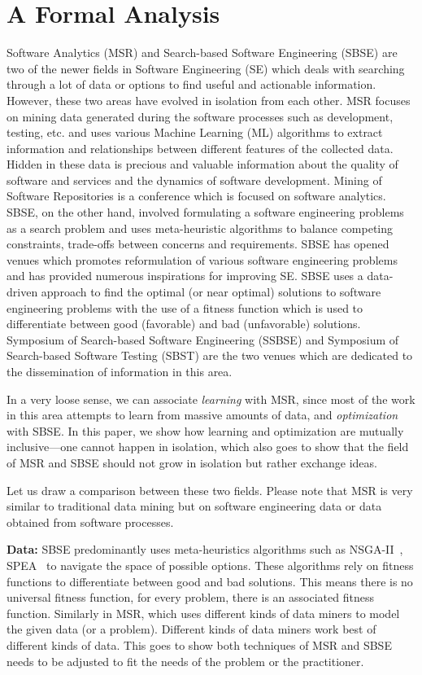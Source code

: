 \documentclass[table, xcdraw, sigconf,review, anonymous]{acmart}
\begin{document}
\section{A Formal Analysis}


Software Analytics (MSR) and Search-based Software Engineering (SBSE) are two of the newer fields in Software Engineering (SE) which deals with searching through a lot of data or options to find useful and actionable information. However, these two areas have evolved in isolation from each other. 
MSR focuses on mining data generated during the software processes such as development, testing, etc. and uses various Machine Learning (ML) algorithms to extract information and relationships between different features of the collected data. 
Hidden in these data is precious and valuable information about the quality of software and services and the dynamics of software development. Mining of Software Repositories is a conference which is focused on software analytics. SBSE, on the other hand, involved formulating a software engineering problems as a search problem and uses meta-heuristic algorithms to balance competing constraints, trade-offs between concerns and requirements. SBSE has opened venues which promotes reformulation of various software engineering problems and has provided numerous inspirations for improving SE.  SBSE uses a data-driven approach to find the optimal (or near optimal) solutions to software engineering problems with the use of a fitness function which is used to differentiate between good (favorable) and bad (unfavorable) solutions. Symposium of Search-based Software Engineering (SSBSE) and Symposium of Search-based Software Testing (SBST) are the two venues which are dedicated to the dissemination of information in this area.

In a very loose sense, we can associate \textit{learning} with MSR, since most of the work in this area attempts to learn from massive amounts of data, and \textit{optimization} with SBSE. In this paper, we show how learning and optimization are mutually inclusive---one cannot happen in isolation, which also goes to show that the field of MSR and SBSE should not grow in isolation but rather exchange ideas.  

Let us draw a comparison between these two fields. Please note that MSR is very similar to traditional data mining but on software engineering data or data obtained from software processes. 

\noindent\textbf{Data:} SBSE predominantly uses meta-heuristics algorithms such as NSGA-II~\cite{deb2000fast}, SPEA~\cite{zitzler2001spea2} to navigate the space of possible options. These algorithms rely on fitness functions to differentiate between good and bad solutions. This means there is no universal fitness function, for every problem, there is an associated fitness function. Similarly in MSR, which uses different kinds of data miners to model the given data (or a problem). Different kinds of data miners work best of different kinds of data. This goes to show both techniques of MSR and SBSE needs to be adjusted to fit the needs of the problem or the practitioner. 
\end{document}
